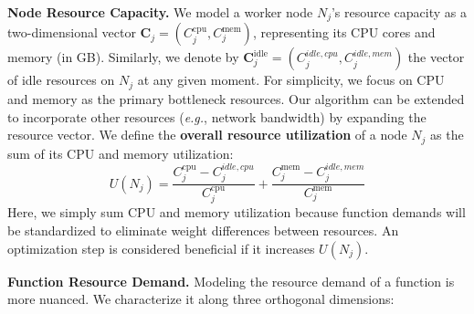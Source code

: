 \textbf{Node Resource Capacity.} We model a worker node $N_j$'s resource capacity 
as a two-dimensional vector $\mathbf{C}_j = \left(C_j^{\text{cpu}}, C_j^{\text{mem}}\right)$, 
representing its CPU cores and memory (in GB). Similarly, we denote by 
$\mathbf{C}_j^{\text{idle}} = \left(C_j^{idle,cpu}, C_j^{idle,mem}\right)$ the 
vector of idle resources on $N_j$ at any given moment. 
For simplicity, we focus on CPU and memory as the primary bottleneck resources. 
Our algorithm can be extended to incorporate other resources (\emph{e.g.}, network bandwidth) by expanding the resource vector. 
We define the \textbf{overall resource utilization} of a node \(N_j\) as the sum of its CPU and memory utilization:
\[
U(N_j) = \frac{C_j^{\text{cpu}} - C_j^{idle,cpu}}{C_j^{\text{cpu}}} + \frac{C_j^{\text{mem}} - C_j^{idle,mem}}{C_j^{\text{mem}}}
\]
Here, we simply sum CPU and memory utilization because function demands will be standardized to eliminate weight differences between resources. An optimization step is considered beneficial if it increases \(U(N_j)\).

\textbf{Function Resource Demand.} Modeling the resource demand of a function is 
more nuanced. We characterize it along three orthogonal dimensions:

